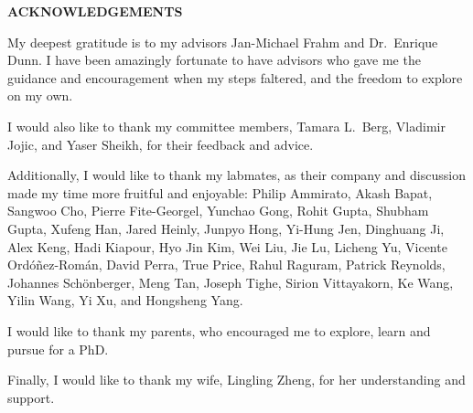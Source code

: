 
\begin{center}
\vspace*{46pt}
\textbf{ACKNOWLEDGEMENTS}
\vspace{10pt}
\end{center}


My deepest gratitude is to my advisors Jan-Michael Frahm and Dr.~Enrique Dunn. I have been amazingly fortunate to have advisors who gave me the guidance and encouragement when my steps faltered, and the freedom to explore on my own.

I would also like to thank my committee members, Tamara L.~Berg, Vladimir Jojic, and Yaser Sheikh, for their feedback and advice.

Additionally, I would like to thank my labmates, as their company and discussion made my time more fruitful and enjoyable:
Philip Ammirato,
Akash Bapat,
Sangwoo Cho,
Pierre Fite-Georgel,
Yunchao Gong,
Rohit Gupta,
Shubham Gupta,
Xufeng Han,
Jared Heinly,
Junpyo Hong,
Yi-Hung Jen,
Dinghuang Ji,
Alex Keng,
Hadi Kiapour,
Hyo Jin Kim,
Wei Liu,
Jie Lu,
Licheng Yu,
Vicente Ord\'{o}\~{n}ez-Rom\'{a}n,
David Perra,
True Price,
Rahul Raguram,
Patrick Reynolds,
Johannes Sch\"{o}nberger,
Meng Tan,
Joseph Tighe,
Sirion Vittayakorn,
Ke Wang,
Yilin Wang,
Yi Xu,
and
Hongsheng Yang.

I would like to thank my parents, who encouraged me to explore, learn and pursue for a PhD.

Finally, I would like to thank my wife, Lingling Zheng, for her understanding and support.

\clearpage
